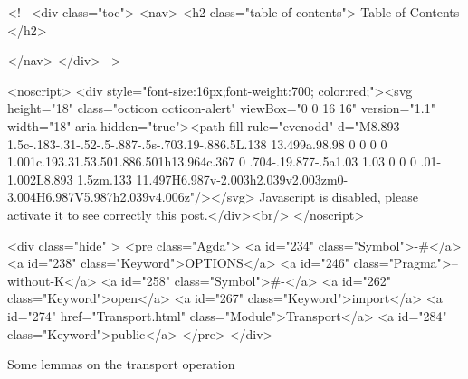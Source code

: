   <!-- 
  <div class="toc">
    <nav>
    <h2 class="table-of-contents"> Table of Contents </h2>
      

    </nav>
  </div>
   -->

  <noscript>
  <div style="font-size:16px;font-weight:700; color:red;"><svg height="18" class="octicon octicon-alert" viewBox="0 0 16 16" version="1.1" width="18" aria-hidden="true"><path fill-rule="evenodd" d="M8.893 1.5c-.183-.31-.52-.5-.887-.5s-.703.19-.886.5L.138 13.499a.98.98 0 0 0 0 1.001c.193.31.53.501.886.501h13.964c.367 0 .704-.19.877-.5a1.03 1.03 0 0 0 .01-1.002L8.893 1.5zm.133 11.497H6.987v-2.003h2.039v2.003zm0-3.004H6.987V5.987h2.039v4.006z"/></svg> Javascript is disabled, please activate it to see correctly this post.</div><br/>
  </noscript>

  <div class="hide" >
<pre class="Agda">
<a id="234" class="Symbol">{-#</a> <a id="238" class="Keyword">OPTIONS</a> <a id="246" class="Pragma">--without-K</a> <a id="258" class="Symbol">#-}</a>
<a id="262" class="Keyword">open</a> <a id="267" class="Keyword">import</a> <a id="274" href="Transport.html" class="Module">Transport</a> <a id="284" class="Keyword">public</a>
</pre>
</div>

Some lemmas on the transport operation

